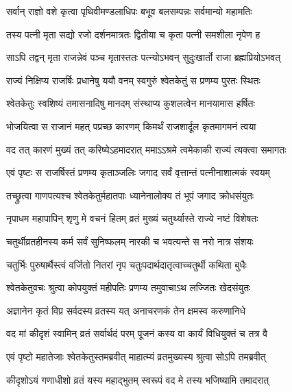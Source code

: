 \twolineshloka
{सर्वान् राज्ञो वशे कृत्वा पृथिवीमण्डलाधिपः}
{बभूव बलसम्पन्नः सर्वमान्यो महामतिः} %

\twolineshloka
{तस्य पत्नी मृता सद्यो रजो दर्शनमात्रतः}
{द्वितीया च कृता पत्नी समशीला नृपेण ह} %

\twolineshloka
{साऽपि तद्वन् मृता राजन्नेवं पञ्च मृतास्ततः}
{पत्न्योऽभवन् सुदुःखार्तो राजा ब्रह्मप्रियोऽभवत्} %

\twolineshloka
{राज्यं निक्षिप्य राजर्षिः प्रधानेषु ययौ वनम्}
{स्वगुरुं श्वेतकेतुं स प्रणम्य पुरतः स्थितः} %

\twolineshloka
{श्वेतकेतुः स्वशिष्यं तमासनादिषु मानदम्}
{संस्थाप्य कुशलत्वेन मानयामास हर्षितः} %

\twolineshloka
{भोजयित्वा स राजानं महत् पप्रच्छ कारणम्}
{किमर्थं राजशार्दूल कृतमागमनं त्वया} %

\twolineshloka
{वद तत् कारणं मुख्यं तत् करिष्येऽहमादरात्}
{ममाऽऽश्रमे त्वमेकाकी राज्यं त्यक्त्वा समागतः} %

\twolineshloka
{एवं पृष्टः स राजर्षिस्तं प्रणम्य कृताञ्जलिः}
{जगाद सर्वं वृत्तान्तं पत्नीनाशात्मकं स्वयम्} %

\twolineshloka
{तच्छ्रुत्वा गाणपत्यश्च श्वेतकेतुर्महातपाः}
{ध्यानेनालोक्य तं भूपं जगाद क्रोधसंयुतः} %


\twolineshloka
{नृपाधम महापापिन् श‍ृणु मे वचनं हितम्}
{व्रतं मुख्यं चतुर्थ्यास्ते राज्ये नष्टं विशेषतः} %

\twolineshloka
{चतुर्थीव्रतहीनस्य कर्म सर्वं सुनिष्फलम्}
{नारकी च भवत्यन्ते स नरो नात्र संशयः} %

\twolineshloka
{चतुर्भिः पुरुषार्थैस्त्वं वर्जितो नितरां नृप}
{चतुःपदार्थदातृत्वाच्चतुर्थी कथिता बुधैः} %

\twolineshloka
{श्वेतकेतुवचः श्रुत्वा कोपयुक्तं महीपतिः}
{प्रणम्य तमुवाचाऽथ लज्जितः खेदसंयुतः} %


\twolineshloka
{अज्ञानेन कृतं विप्र सर्वदस्य व्रतस्य यत्}
{अनाचरणकं तेन क्षमस्व करुणानिधे} %

\twolineshloka
{वद मां कीदृशं स्वामिन् व्रतं सर्वार्थदं परम्}
{पूजनं कस्य वा कार्यं विधियुक्तं च तत्र वै} %

\twolineshloka
{एवं पृष्टो महातेजाः श्वेतकेतुस्तमब्रवीत्}
{माहात्म्यं व्रतमुख्यस्य श्रुत्वा सोऽपि तमब्रवीत्} %


\twolineshloka
{कीदृशोऽयं गणाधीशो व्रतं यस्य महाद्भुतम्}
{स्वरूपं वद मे तस्य भजिष्यामि तमादरात्} %

